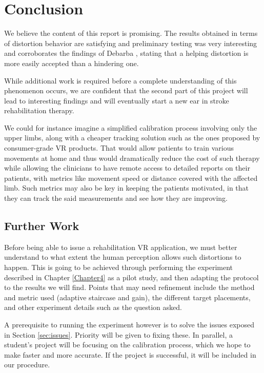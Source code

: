 
\chapter{Conclusion} %

\label{Chapter6}

We believe the content of this report is promising. The results obtained in terms of distortion behavior are satisfying and preliminary testing was very interesting and corroborates the findings of Debarba \cite{debarba2017embodiment}, stating that a helping distortion is more easily accepted than a hindering one.

While additional work is required before a complete understanding of this phenomenon occurs, we are confident that the second part of this project will lead to interesting findings and will eventually start a new ear in stroke rehabilitation therapy.

We could for instance imagine a simplified calibration process involving only the upper limbs, along with a cheaper tracking solution such as the ones proposed by consumer-grade VR products. That would allow patients to train various movements at home and thus would dramatically reduce the cost of such therapy while allowing the clinicians to have remote access to detailed reports on their patients, with metrics like movement speed or distance covered with the affected limb. Such metrics may also be key in keeping the patients motivated, in that they can track the said measurements and see how they are improving.

\section{Further Work}

Before being able to issue a rehabilitation VR application, we must better understand to what extent the human perception allows such distortions to happen. This is going to be achieved through performing the experiment described in Chapter \ref{Chapter4} as a pilot study, and then adapting the protocol to the results we will find. Points that may need refinement include the method and metric used (adaptive staircase and gain), the different target placements, and other experiment details such as the question asked.

A prerequisite to running the experiment however is to solve the issues exposed in Section \ref{sec:issues}. Priority will be given to fixing these. In parallel, a student's project will be focusing on the calibration process, which we hope to make faster and more accurate. If the project is successful, it will be included in our procedure.

